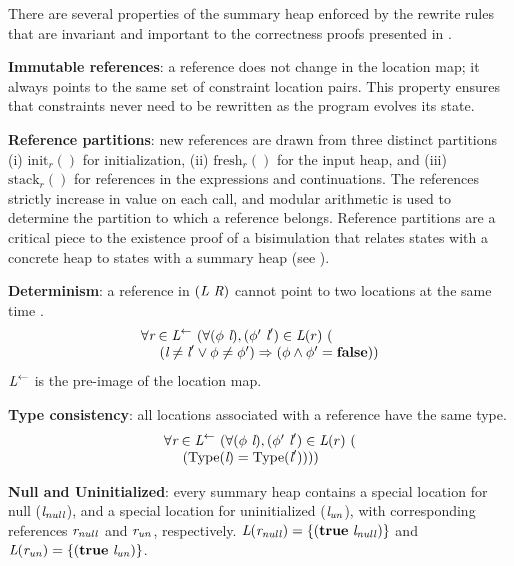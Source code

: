 There are several properties of the summary heap 
enforced by the rewrite rules that are invariant and
important to the correctness proofs
presented in .
\begin{compactitem}
\item \textbf{Immutable references}: a reference does not change in
  the location map; it always points to the same set of constraint
  location pairs. This property ensures that constraints never need to
  be rewritten as the program evolves its state.
\item \textbf{Reference partitions}: new references are drawn from
  three distinct partitions (i) $\mathrm{init}_r()$ for initialization, (ii)
  $\mathrm{fresh}_r()$ for the input heap, and (iii) $\mathrm{stack}_r()$
  for references in the expressions and continuations. The references
  strictly increase in value on each call, and modular arithmetic is
  used to determine the partition to which a reference belongs. Reference
  partitions are a critical piece to the existence proof of a
  bisimulation that relates states with a concrete heap to states with
  a summary heap (see ).
\item \textbf{Determinism}: a reference in  $(\emph{L}\ \emph{R})$ cannot point to two  locations at the same time .
\[
\begin{array}{l}
\forall \cfgnt{r} \in \cfgnt{L}^\leftarrow\ (\forall (\phi\ \cfgnt{l}),(\phi^\prime\ \cfgnt{l}^\prime) \in \cfgnt{L}(r)\ (\\
\ \ \ \ (\cfgnt{l} \neq \cfgnt{l}^\prime \vee \phi \neq \phi^\prime) \Rightarrow (\phi \wedge \phi^\prime = \cfgt{false}))
\end{array}
\]
$\emph{L}^\leftarrow$ is the pre-image of the location map. 
\item \textbf{Type consistency}: all locations associated with a reference have the same type.
\[
\begin{array}{l}
\forall \cfgnt{r} \in \cfgnt{L}^\leftarrow\ (\forall (\phi\ \cfgnt{l}),(\phi^\prime\ \cfgnt{l}^\prime) \in \cfgnt{L}(r)\ (\\
\ \ \ \ (\mathrm{Type}\lp\cfgnt{l}\rp = \mathrm{Type}\lp\cfgnt{l}^\prime\rp)))
\end{array}
\]
\item \textbf{Null and Uninitialized}: every summary heap contains 
a special location for null ($\emph{l}_\mathit{null}$), and a special
location for uninitialized
  ($\emph{l}_\mathit{un}$), with corresponding references
  $\emph{r}_\mathit{null}$ and
  $\emph{r}_\mathit{un}$, respectively. $\emph{L}(\emph{r}_\mathit{null}) =
  \{(\textbf{true}\ \emph{l}_\mathit{null})\}$ and
  $\emph{L}(\emph{r}_\mathit{un}) =
  \{(\textbf{true}\ \emph{l}_\mathit{un})\}$.
\end{compactitem}

